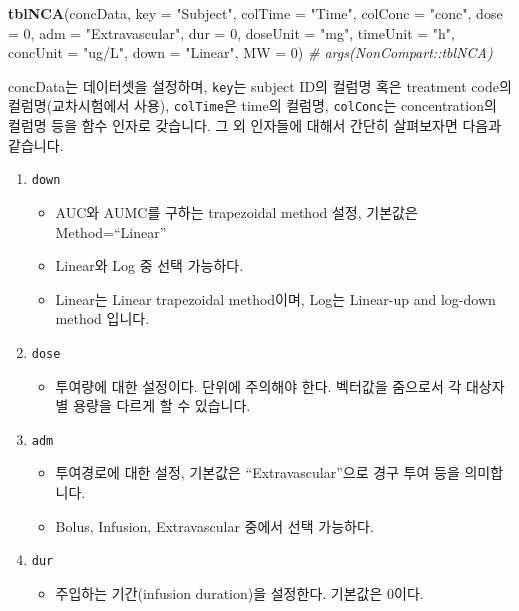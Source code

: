 \documentclass[12pt,]{krantz}
\newenvironment{Shaded}{\begin{snugshade}}{\end{snugshade}}
\newcommand{\KeywordTok}[1]{\textcolor[rgb]{0.13,0.29,0.53}{\textbf{#1}}}
\newcommand{\DataTypeTok}[1]{\textcolor[rgb]{0.13,0.29,0.53}{#1}}
\newcommand{\DecValTok}[1]{\textcolor[rgb]{0.00,0.00,0.81}{#1}}
\newcommand{\StringTok}[1]{\textcolor[rgb]{0.31,0.60,0.02}{#1}}
\newcommand{\CommentTok}[1]{\textcolor[rgb]{0.56,0.35,0.01}{\textit{#1}}}
\newcommand{\NormalTok}[1]{#1}
\providecommand{\tightlist}{%
  \setlength{\itemsep}{0pt}\setlength{\parskip}{0pt}}
\theoremstyle{definition}
\theoremstyle{definition}
\theoremstyle{definition}
\theoremstyle{remark}
\begin{document}
\begin{Shaded}
\begin{Highlighting}[]
\KeywordTok{tblNCA}\NormalTok{(concData, }\DataTypeTok{key =} \StringTok{"Subject"}\NormalTok{, }\DataTypeTok{colTime =} \StringTok{"Time"}\NormalTok{, }\DataTypeTok{colConc =} \StringTok{"conc"}\NormalTok{, }
       \DataTypeTok{dose =} \DecValTok{0}\NormalTok{, }\DataTypeTok{adm =} \StringTok{"Extravascular"}\NormalTok{, }\DataTypeTok{dur =} \DecValTok{0}\NormalTok{, }\DataTypeTok{doseUnit =} \StringTok{"mg"}\NormalTok{, }
       \DataTypeTok{timeUnit =} \StringTok{"h"}\NormalTok{, }\DataTypeTok{concUnit =} \StringTok{"ug/L"}\NormalTok{, }\DataTypeTok{down =} \StringTok{"Linear"}\NormalTok{, }\DataTypeTok{MW =} \DecValTok{0}\NormalTok{)}
\CommentTok{# args(NonCompart::tblNCA)}
\end{Highlighting}
\end{Shaded}

concData는 데이터셋을 설정하며, \texttt{key}는 subject ID의 컬럼명 혹은
treatment code의 컬럼명(교차시험에서 사용), \texttt{colTime}은 time의
컬럼명, \texttt{colConc}는 concentration의 컬럼명 등을 함수 인자로
갖습니다. 그 외 인자들에 대해서 간단히 살펴보자면 다음과 같습니다.

\begin{enumerate}
\def\labelenumi{\arabic{enumi}.}
\tightlist
\item
  \texttt{down}

  \begin{itemize}
  \tightlist
  \item
    AUC와 AUMC를 구하는 trapezoidal method 설정, 기본값은
    Method=``Linear''
  \item
    Linear와 Log 중 선택 가능하다.
  \item
    Linear는 Linear trapezoidal method이며, Log는 Linear-up and log-down
    method 입니다.
  \end{itemize}
\item
  \texttt{dose}

  \begin{itemize}
  \tightlist
  \item
    투여량에 대한 설정이다. 단위에 주의해야 한다. 벡터값을 줌으로서 각
    대상자별 용량을 다르게 할 수 있습니다.
  \end{itemize}
\item
  \texttt{adm}

  \begin{itemize}
  \tightlist
  \item
    투여경로에 대한 설정, 기본값은 ``Extravascular''으로 경구 투여 등을
    의미합니다.
  \item
    Bolus, Infusion, Extravascular 중에서 선택 가능하다.
  \end{itemize}
\item
  \texttt{dur}

  \begin{itemize}
  \tightlist
  \item
    주입하는 기간(infusion duration)을 설정한다. 기본값은 0이다.
  \end{itemize}
\end{enumerate}
\end{document}
